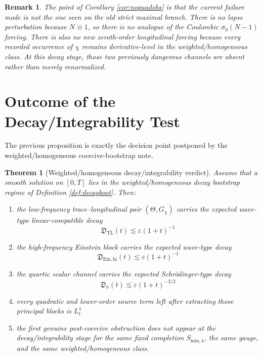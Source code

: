 \documentclass[11pt]{article}
\newtheorem{remark}{Remark}
\newtheorem{theorem}{Theorem}
\begin{document}
\begin{remark}
The point of Corollary \ref{cor:noquadobs} is that the current failure mode is \emph{not} the one seen on the old strict maximal branch. There is no lapse perturbation because \(N\equiv 1\), so there is no analogue of the Coulombic \(\sigma_0(N-1)\) forcing. There is also no new zeroth-order longitudinal forcing because every recorded occurrence of \(\chi\) remains derivative-level in the weighted/homogeneous class. At this decay stage, those two previously dangerous channels are absent rather than merely renormalized.
\end{remark}

\section{Outcome of the Decay/Integrability Test}

The previous proposition is exactly the decision point postponed by the weighted/homogeneous coercive-bootstrap note.

\begin{theorem}[Weighted/homogeneous decay/integrability verdict]
\label{thm:verdict}
Assume that a smooth solution on \([0,T]\) lies in the weighted/homogeneous decay bootstrap regime of Definition \ref{def:decayboot}. Then:
\begin{enumerate}
    \item the low-frequency trace--longitudinal pair \((\Theta,G_\chi)\) carries the expected wave-type linear-compatible decay
    \[
    \mathfrak D_{\mathrm{TL}}(t)\lesssim \varepsilon(1+t)^{-1}
    \]
    \item the high-frequency Einstein block carries the expected wave-type decay
    \[
    \mathfrak D_{\mathrm{Ein,hi}}(t)\lesssim \varepsilon(1+t)^{-1}
    \]
    \item the quartic scalar channel carries the expected Schr\"odinger-type decay
    \[
    \mathfrak D_\sigma(t)\lesssim \varepsilon(1+t)^{-3/2}
    \]
    \item every quadratic and lower-order source term left after extracting those principal blocks is \(L_t^1\)
    \item the first genuine post-coercive obstruction does \emph{not} appear at the decay/integrability stage for the same fixed completion \(S_{\mathrm{min},4}\), the same gauge, and the same weighted/homogeneous class.
\end{enumerate}
\end{theorem}
\end{document}
